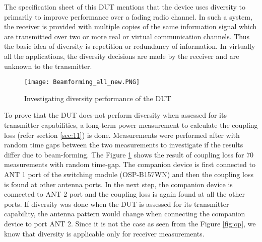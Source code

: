 The specification sheet of this \acs{DUT} mentions that the device uses diversity to primarily to improve performance over a fading radio channel. In such a system, the receiver is provided with multiple copies of the same information signal which are transmitted over two or more real or virtual communication channels. Thus the basic idea of diversity is repetition or redundancy of information. In virtually all the applications, the diversity decisions are made by the receiver and are unknown to the transmitter. \\

\begin{figure}[H]
\centering
\texttt{[image: Beamforming\_all\_new.PNG]}
\caption{Investigating diversity performance of the \acs{DUT}}
\label{fig:11} 
\end{figure}

To prove that the \acs{DUT} does-not perform diversity when assessed for its transmitter capabilities, a long-term power measurement to calculate the coupling loss (refer section \ref{sec:11}) is done. Measurements were performed after with random time gaps between the two measurements to investigate if the results differ due to beam-forming. The Figure \ref{fig:11} shows the result of coupling loss for 70 measurements with random time-gap. The companion device is first connected to ANT 1 port of the switching module (OSP-B157WN) and then the coupling loss is found at other antenna ports. In the next step, the companion device is connected to ANT 2 port and the coupling loss is again found at all the other ports. If diversity was done when the \acs{DUT} is assessed for its transmitter capability, the antenna pattern would change when connecting the companion device to port ANT 2. Since it is not the case as seen from the Figure \ref{fig:op}, we know that diversity is applicable only for receiver measurements.









